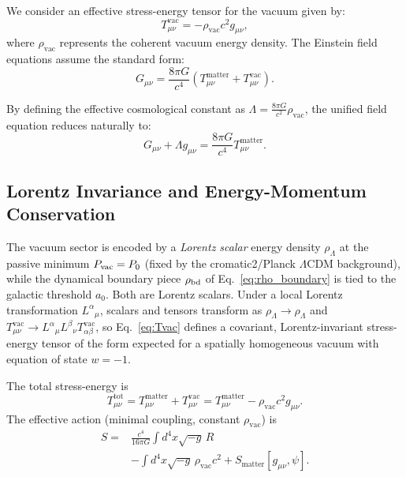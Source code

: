 \documentclass[prd,
               reprint,
               aps,
               preprintnumbers,
               nofootinbib,
               longbibliography,
               floatfix]{revtex4-2}
\begin{document}
We consider an effective stress-energy tensor for the vacuum 
given by:
\begin{equation}
\label{eq:Tvac}
T_{\mu\nu}^{\text{vac}} = -\rho_{\text{vac}} c^2 g_{\mu\nu},
\end{equation}
where $\rho_{\text{vac}}$ represents the coherent vacuum energy 
density. The Einstein field equations assume the standard 
form:
\begin{equation}
\label{eq:einstein_split}
G_{\mu\nu} = \frac{8\pi G}{c^4} \left( T_{\mu\nu}^{\text{matter}} 
+ T_{\mu\nu}^{\text{vac}} \right).
\end{equation}

By defining the effective cosmological constant as 
$\Lambda = \frac{8\pi G}{c^2} \rho_{\text{vac}}$, the 
unified field equation reduces naturally to:
\begin{equation}
\label{eq:einstein_lambda}
G_{\mu\nu} + \Lambda g_{\mu\nu} = \frac{8\pi G}{c^4} 
T_{\mu\nu}^{\text{matter}}.
\end{equation}

\subsection{Lorentz Invariance and Energy-Momentum Conservation}
\label{sec:conservation}

The vacuum sector is encoded by a \emph{Lorentz scalar} energy density
$\rho_{\Lambda}$ at the passive minimum $P_{\rm vac}=P_0$ (fixed by the
cromatic2/Planck $\Lambda$CDM background), while the dynamical boundary
piece $\rho_{\rm bd}$ of Eq.~\eqref{eq:rho_boundary} is tied to the
galactic threshold $a_0$.
Both are Lorentz scalars.
Under a local Lorentz transformation
$L^\alpha{}_\mu$, scalars and tensors transform as
$\rho_{\Lambda}\to\rho_{\Lambda}$ and
$T^{\text{vac}}_{\mu\nu}\to L^\alpha{}_\mu L^\beta{}_\nu
T^{\text{vac}}_{\alpha\beta}$, so Eq.~\eqref{eq:Tvac} defines a covariant,
Lorentz-invariant stress-energy tensor of the form expected for a
spatially homogeneous vacuum with equation of state $w=-1$.

The total stress-energy is
\begin{equation}
\label{eq:Ttotal}
T_{\mu\nu}^{\text{tot}}
=
T_{\mu\nu}^{\text{matter}}
+
T_{\mu\nu}^{\text{vac}}
=
T_{\mu\nu}^{\text{matter}}
-\rho_{\text{vac}} c^2 g_{\mu\nu}.
\end{equation}
The effective action (minimal coupling, constant $\rho_{\text{vac}}$) is
\begin{equation}
\label{eq:effective_action_constant}
\begin{aligned}
S = &\frac{c^4}{16\pi G} \int\! d^4x \sqrt{-g}\, R \\
&- \int\! d^4x \sqrt{-g}\, \rho_{\text{vac}} c^2 
+ S_{\text{matter}}[g_{\mu\nu}, \psi].
\end{aligned}
\end{equation}
\end{document}
